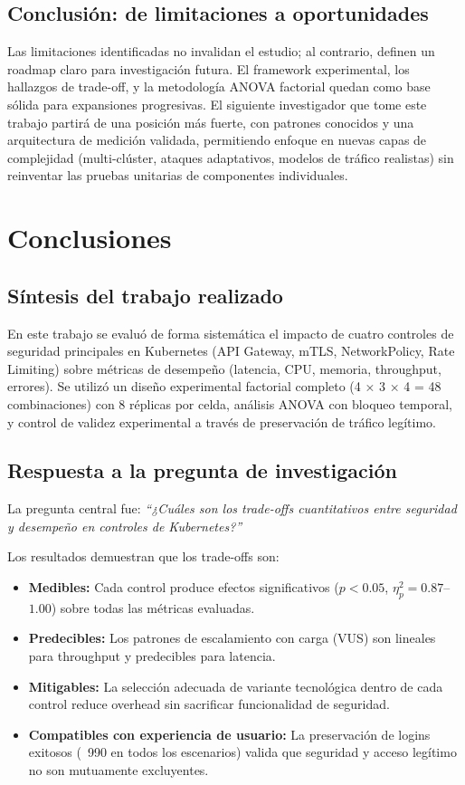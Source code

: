 \section{Conclusión: de limitaciones a oportunidades}

Las limitaciones identificadas no invalidan el estudio; al contrario, definen un roadmap claro para investigación futura. El framework experimental, los hallazgos de trade-off, y la metodología ANOVA factorial quedan como base sólida para expansiones progresivas. El siguiente investigador que tome este trabajo partirá de una posición más fuerte, con patrones conocidos y una arquitectura de medición validada, permitiendo enfoque en nuevas capas de complejidad (multi-clúster, ataques adaptativos, modelos de tráfico realistas) sin reinventar las pruebas unitarias de componentes individuales.

\chapter{Conclusiones}
\label{cap:conclusiones}

\section{Síntesis del trabajo realizado}

En este trabajo se evaluó de forma sistemática el impacto de cuatro controles de seguridad principales en Kubernetes (API Gateway, mTLS, NetworkPolicy, Rate Limiting) sobre métricas de desempeño (latencia, CPU, memoria, throughput, errores). Se utilizó un diseño experimental factorial completo (4 × 3 × 4 = 48 combinaciones) con 8 réplicas por celda, análisis ANOVA con bloqueo temporal, y control de validez experimental a través de preservación de tráfico legítimo.

\section{Respuesta a la pregunta de investigación}

La pregunta central fue: \textit{``¿Cuáles son los trade-offs cuantitativos entre seguridad y desempeño en controles de Kubernetes?''} 

Los resultados demuestran que los trade-offs son:
\begin{itemize}
	\item \textbf{Medibles:} Cada control produce efectos significativos ($p < 0.05$, $\eta^2_p = 0.87$--$1.00$) sobre todas las métricas evaluadas.
	\item \textbf{Predecibles:} Los patrones de escalamiento con carga (VUS) son lineales para throughput y predecibles para latencia.
	\item \textbf{Mitigables:} La selección adecuada de variante tecnológica dentro de cada control reduce overhead sin sacrificar funcionalidad de seguridad.
	\item \textbf{Compatibles con experiencia de usuario:} La preservación de logins exitosos (~990 en todos los escenarios) valida que seguridad y acceso legítimo no son mutuamente excluyentes.
\end{itemize}

